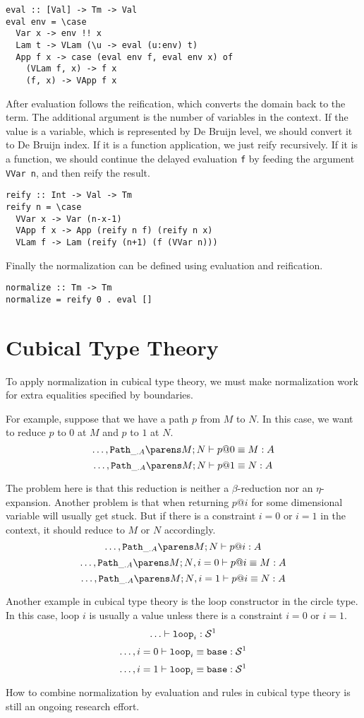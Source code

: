 \documentclass[11pt]{article}
\begin{document}
\begin{verbatim}
eval :: [Val] -> Tm -> Val
eval env = \case
  Var x -> env !! x
  Lam t -> VLam (\u -> eval (u:env) t)
  App f x -> case (eval env f, eval env x) of
    (VLam f, x) -> f x
    (f, x) -> VApp f x
\end{verbatim}

After evaluation follows the reification, which converts the domain back to the term. The additional argument is the number of variables in the context. If the value is a variable, which is represented by De Bruijn level, we should convert it to De Bruijn index. If it is a function application, we just reify recursively. If it is a function, we should continue the delayed evaluation \verb=f= by feeding the argument \verb=VVar n=, and then reify the result.
\begin{verbatim}
reify :: Int -> Val -> Tm
reify n = \case
  VVar x -> Var (n-x-1)
  VApp f x -> App (reify n f) (reify n x)
  VLam f -> Lam (reify (n+1) (f (VVar n)))
\end{verbatim}

Finally the normalization can be defined using evaluation and reification.
\begin{verbatim}
normalize :: Tm -> Tm
normalize = reify 0 . eval []
\end{verbatim}

\section{Cubical Type Theory}
To apply normalization in cubical type theory, we must make normalization work for extra equalities specified by boundaries.

For example, suppose that we have a path $p$ from $M$ to $N$. In this case, we want to reduce $p$ to $0$ at $M$ and $p$ to $1$ at $N$.
\[
  \eqterm{\hdots, \pathtype{\_}{A}{M}{N}}{p@0}{M}{A}
\]
\[
  \eqterm{\hdots, \pathtype{\_}{A}{M}{N}}{p@1}{N}{A}
\]

The problem here is that this reduction is neither a $\beta$-reduction nor an $\eta$-expansion. Another problem is that when returning $p@i$ for some dimensional variable will usually get stuck. But if there is a constraint $i=0$ or $i=1$ in the context, it should reduce to $M$ or $N$ accordingly.
\[
\oftype{\hdots, \pathtype{\_}{A}{M}{N}}{p@i}{A}
\]
\[
\eqterm{\hdots, \pathtype{\_}{A}{M}{N}, i=0}{p@i}{M}{A}
\]
\[
\eqterm{\hdots, \pathtype{\_}{A}{M}{N}, i=1}{p@i}{N}{A}
\]

Another example in cubical type theory is the loop constructor in the circle type. In this case, loop $i$ is usually a value unless there is a constraint $i=0$ or $i=1$.
\[
\oftype{\hdots}{\sphereloop_i}{\spheretype{1}}
\]
\[
\eqterm{\hdots, i=0}{\sphereloop_i}{\spherebase}{\spheretype{1}}
\]
\[
\eqterm{\hdots, i=1}{\sphereloop_i}{\spherebase}{\spheretype{1}}
\]

How to combine normalization by evaluation and rules in cubical type theory is still an ongoing research effort.
\end{document}
